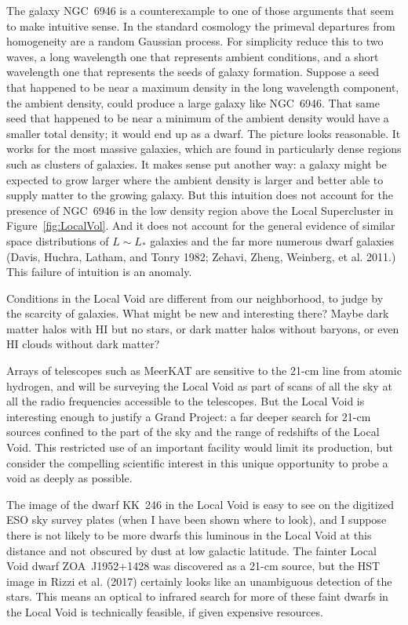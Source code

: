\documentclass[fleqn,12pt]{article}
\begin{document}
The galaxy NGC~6946 is a counterexample to one of those arguments that seem to make intuitive sense. In the standard cosmology the primeval departures from homogeneity are a random Gaussian process. For simplicity reduce this to two waves, a long wavelength one that represents ambient conditions, and a short wavelength one that represents the seeds of galaxy formation. Suppose a seed that happened to be near a maximum density in the long wavelength component, the ambient density, could produce a large galaxy like NGC~6946. That same seed that happened to be near a minimum of the ambient density would have a smaller total density; it would end up as a dwarf. The picture looks reasonable. It works for the most massive galaxies, which are found in particularly dense regions such as clusters of galaxies. It makes sense put another way: a galaxy might be expected to grow larger where the ambient density is larger and better able to supply matter to the growing galaxy. But this intuition does not account for the presence of NGC~6946 in the low density region above the Local Supercluster in Figure~\ref{fig:LocalVol}. And it does not account for the general evidence of similar space distributions of $L\sim L_\ast$ galaxies and the far more numerous dwarf galaxies (Davis, Huchra, Latham, and Tonry 1982;  Zehavi, Zheng, Weinberg, et al. 2011.) This failure of intuition is an anomaly.  

Conditions in the Local Void are different from our neighborhood, to judge by the scarcity of galaxies. What might be new and interesting there? Maybe dark matter halos with HI but no stars, or dark matter halos without baryons, or even HI clouds without dark matter? 

Arrays of telescopes such as MeerKAT are sensitive to the 21-cm line from atomic hydrogen, and  will be surveying the Local Void as part of scans of all the sky at all the radio frequencies accessible to the telescopes. But the Local Void is interesting enough to justify a Grand Project: a far deeper search for 21-cm sources confined to the part of the sky and the range of redshifts of the Local Void. This restricted use of an important facility would limit its production, but consider the compelling scientific interest in this unique opportunity to probe a void as deeply as possible. 

The image of the dwarf KK~246 in the Local Void is easy to see on the digitized ESO sky survey  plates (when I have been shown where to look), and I suppose there is not likely to be more dwarfs this luminous in the Local Void at this distance and not obscured by dust at low galactic latitude. The fainter Local Void dwarf ZOA~J1952+1428 was discovered as a 21-cm source, but the HST image in Rizzi et al. (2017) certainly looks like an unambiguous detection of the stars. This means an optical to infrared search for more of these faint dwarfs in the Local Void is technically feasible, if given expensive resources. 
\end{document}
